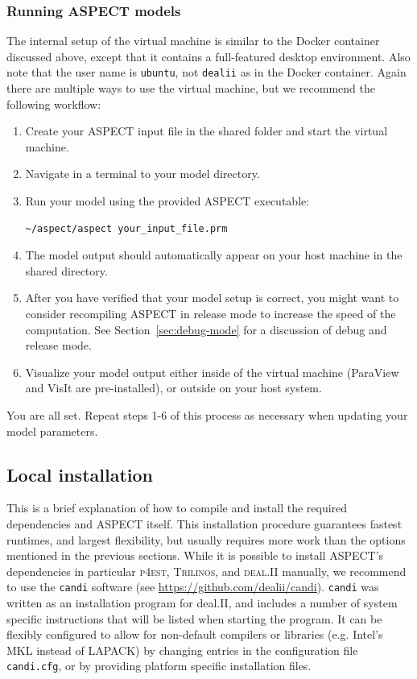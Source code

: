 \documentclass{article}
\newcommand{\dealii}{{\textsc{deal.II}}}
\newcommand{\pfrst}{{\normalfont\textsc{p4est}}}
\newcommand{\trilinos}{{\textsc{Trilinos}}}
\newcommand{\aspect}{\textsc{ASPECT}}
\begin{document}
\subsubsection{Running \aspect{} models}

The internal setup of the virtual machine is similar to the Docker container
discussed above, except that it contains a full-featured desktop environment.
Also note that the user name is \texttt{ubuntu}, not \texttt{dealii} as in the
Docker container. Again there are multiple ways to use the virtual machine, but
we recommend the following workflow:

\begin{enumerate}
\item Create your \aspect{} input file in the shared folder and start the
virtual machine.
\item Navigate in a terminal to your model directory.
\item Run your model using the provided \aspect{} executable:

\begin{lstlisting}[frame=single,language=ksh]
~/aspect/aspect your_input_file.prm
\end{lstlisting}

\item The model output should automatically appear on your host machine in the
shared directory.

\item After you have verified that your model setup is correct, you might want
to consider recompiling \aspect{} in release mode to increase the speed of the
computation. See Section~\ref{sec:debug-mode} for a discussion of debug and
release mode.

\item Visualize your model output either inside of the virtual machine
(ParaView and VisIt are pre-installed), or outside on your host system.
\end{enumerate}

You are all set. Repeat steps 1-6 of this process as necessary when updating
your model parameters.

\subsection{Local installation}

This is a brief explanation of how to compile and install the required dependencies and
\aspect{} itself. This installation procedure guarantees fastest runtimes, and largest flexibility,
but usually requires more work than the options mentioned in the previous sections.
While it is possible to install ASPECT's dependencies in particular \pfrst{}, \trilinos{},
and \dealii{} manually, we recommend to use the
\texttt{candi} software (see \url{https://github.com/dealii/candi}). \texttt{candi} was written
as an installation program for deal.II, and includes a number of system specific instructions
that will be listed when starting the program. It can be flexibly configured to allow for
non-default compilers or libraries (e.g. Intel's MKL instead of LAPACK) by changing entries
in the configuration file \texttt{candi.cfg}, or by providing platform specific installation files.
\end{document}
